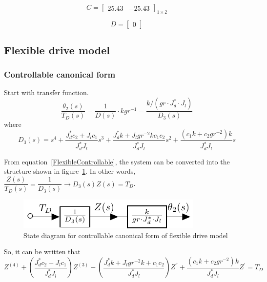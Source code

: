\documentclass[a4paper, 12pt]{article}
\begin{document}
\begin{equation}\label{rigidJordanC}
C = \begin{bmatrix}
25.43	&	-25.43
\end{bmatrix}_{1\times 2}
\end{equation}


\begin{equation}
D = \begin{bmatrix} 0 \end{bmatrix}
\end{equation}



\subsection{Flexible drive model}
\subsubsection{Controllable canonical form}
\hspace{2.5ex}Start with transfer function. 
\begin{equation}\label{FlexibleControllable}
\dfrac{\theta_2(s)}{T_D(s)} = \dfrac{1}{D(s)} \cdot kgr^{-1}=\dfrac{k/(gr\cdot J_d^*\cdot J_l)}{D_3(s)}
\end{equation}
where 
\begin{equation}
D_3(s) = s^4 + \dfrac{J_d^*c_2 + J_lc_1}{J_d^*J_l} s^3 + \dfrac{J_d^*k + J_l gr^{-2}k c_1c_2}{J_d^*J_l}s^2 +\dfrac{(c_1k + c_2 gr^{-2})k}{J_d^*J_l}s
\end{equation}

From equation~\ref{FlexibleControllable}, the system can be converted into the structure shown in figure~\ref{FlexibleControllableChart}. In other words, $\dfrac{Z(s)}{T_D(s)} = \dfrac{1}{D_3(s)} \longrightarrow D_3(s) Z(s) = T_D$. 
\begin{figure}[!htbp]
\centering
\includegraphics[scale = 1.5]{ControllableStateDiagram}
\caption{State diagram for controllable canonical form of flexible drive model}
\label{FlexibleControllableChart}
\end{figure}

So, it can be written that 
\begin{equation} \label{ControllableZ}
Z^{(4)} + \left(\dfrac{J_d^*c_2 + J_l c_1}{J_d^*J_l}\right)Z^{(3)} + \left(\dfrac{J_d^* k + J_l gr^{-2} k + c_1 c_2}{J_d^* J_l}\right) Z^{''} + \dfrac{(c_1 k +c_2 gr^{-2})k}{J_d^* J_l} Z^{'} = T_D
\end{equation}
\end{document}
